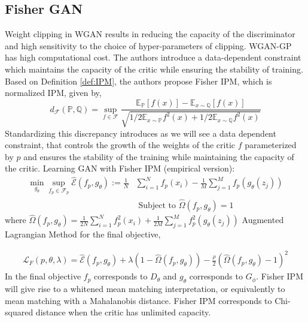 \subsection*{Fisher GAN \citep{fisher}} 
Weight clipping in WGAN results in reducing the capacity of the discriminator and high sensitivity to the choice of hyper-parameters of clipping. WGAN-GP has high computational cost. The authors introduce a data-dependent constraint which maintains the capacity of the critic while ensuring the stability of training.  Based on Definition \ref{def:IPM}, the authors propose Fisher IPM, which is normalized IPM, given by,
$$
d_{\mathscr{F}}(\mathbb{P}, \mathbb{Q})=\sup _{f \in \mathscr{F}} \frac{\mathbb{E}_{\mathbb{P}}[f(x)]-\mathbb{E}_{x \sim \mathbb{Q}}[f(x)]}{\sqrt{1 / 2 \mathbb{E}_{x \sim \mathbb{P}} f^{2}(x)+1 / 2 \mathbb{E}_{x \sim \mathbb{Q}} f^{2}(x)}}
$$
Standardizing this discrepancy introduces as we will see a data dependent constraint, that controls the growth of the weights of the critic $f$ parameterized by $p$ and ensures the stability of the training while maintaining the capacity of the critic.
Learning GAN with Fisher IPM (empirical version):
\begin{equation}
    \label{eq:fishergan}
    \begin{aligned}
         \min _{g_{\theta}} \sup _{f_{p} \in \mathscr{F}_{p}} \hat{\mathcal{E}}\left(f_{p}, g_{\theta}\right) :=\frac{1}{N} & \sum_{i=1}^{N} f_{p}\left(x_{i}\right)-\frac{1}{M} \sum_{j=1}^{M} f_{p}\left(g_{\theta}\left(z_{j}\right)\right) \\ &\text { Subject to } \hat{\Omega}\left(f_{p}, g_{\theta}\right)=1
    \end{aligned}{}
\end{equation}{}
where $\hat{\Omega}\left(f_{p}, g_{\theta}\right)=\frac{1}{2 N} \sum_{i=1}^{N} f_{p}^{2}\left(x_{i}\right)+\frac{1}{2 M} \sum_{j=1}^{M} f_{p}^{2}\left(g_{\theta}\left(z_{j}\right)\right)$ Augmented Lagrangian Method for the final objective,

\begin{equation}
    \begin{aligned}{}
    \mathcal{L}_{F}(p, \theta, \lambda)=\hat{\mathcal{E}}\left(f_{p}, g_{\theta}\right)+  \lambda\left(1-\hat{\Omega}\left(f_{p}, g_{\theta}\right)\right)
     -\frac{\rho}{2}\left(\hat{\Omega}\left(f_{p}, g_{\theta}\right)-1\right)^{2}
    \end{aligned}
\end{equation}{}
In the final objective $f_p$ corresponds to $D_{\theta}$ and $g_{\theta}$ corresponds to $G_{\phi}$.
Fisher IPM will give rise to a whitened mean matching interpretation, or equivalently to mean matching with a Mahalanobis distance. Fisher IPM corresponds to Chi-squared distance when the critic has unlimited capacity.
